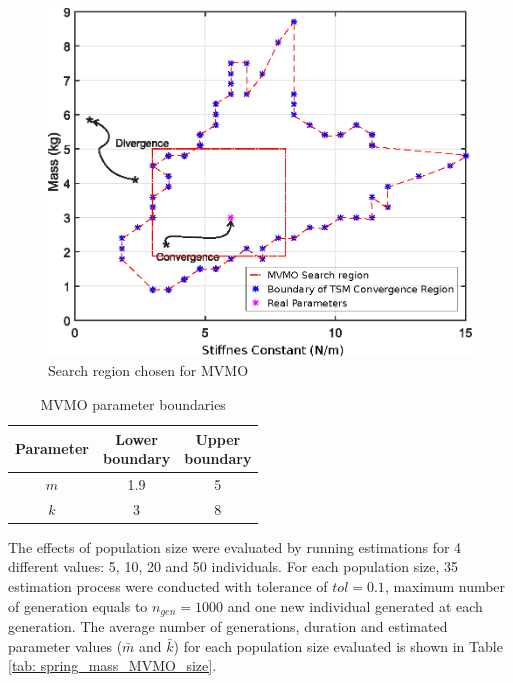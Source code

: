 \begin{figure}[h]
	\caption{Search region chosen for MVMO}
	\begin{center}
		\includegraphics[scale=0.6]{Images/search_region_MVMO.eps}
	\end{center}
	\label{fig: spring_mass_MVMO_region}
\end{figure}

\begin{table}[!h]
	\centering
	\caption{MVMO parameter boundaries}
	\begin{tabular}{c|cc}
		Parameter & \shortstack{Lower \\ boundary} & \shortstack{Upper \\ boundary} \\\hline
		$m$ & 1.9 & 5 \\
		$k$ & 3 & 8 \\
	\end{tabular}
	\label{tab: spring_mass_MVMO_bounds}
\end{table}

The effects of population size were evaluated by running estimations for 4 different values: 5, 10, 20 and 50 individuals. For each population size, 35 estimation process were conducted with tolerance of $tol = 0.1$, maximum number of generation equals to $n_{gen}=1000$ and one new individual generated at each generation. The average number of generations, duration and estimated parameter values ($\bar{m}$ and $\bar{k}$) for each population size evaluated is shown in Table \ref{tab: spring_mass_MVMO_size}.

